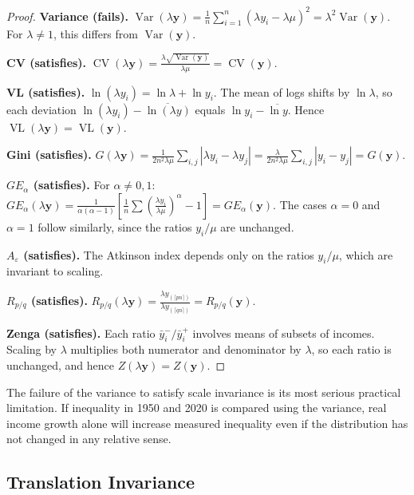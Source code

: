 \documentclass[12pt]{article}
\theoremstyle{plain}
\theoremstyle{definition}
\theoremstyle{remark}
\newcommand{\bfy}{\mathbf{y}}
\begin{document}
\begin{proof}
\textbf{Variance (fails).}
$\operatorname{Var}(\lambda\bfy) = \frac{1}{n}\sum_{i=1}^n (\lambda y_i - \lambda\mu)^2 = \lambda^2 \operatorname{Var}(\bfy)$.
For $\lambda \neq 1$, this differs from $\operatorname{Var}(\bfy)$.

\textbf{CV (satisfies).}
$\operatorname{CV}(\lambda\bfy) = \frac{\lambda\sqrt{\operatorname{Var}(\bfy)}}{\lambda\mu} = \operatorname{CV}(\bfy)$.

\textbf{VL (satisfies).}
$\ln(\lambda y_i) = \ln\lambda + \ln y_i$.
The mean of logs shifts by $\ln\lambda$, so each deviation $\ln(\lambda y_i) - \overline{\ln(\lambda y)}$ equals $\ln y_i - \overline{\ln y}$.
Hence $\operatorname{VL}(\lambda\bfy) = \operatorname{VL}(\bfy)$.

\textbf{Gini (satisfies).}
$G(\lambda\bfy) = \frac{1}{2n^2 \lambda\mu}\sum_{i,j}|\lambda y_i - \lambda y_j| = \frac{\lambda}{2n^2\lambda\mu}\sum_{i,j}|y_i - y_j| = G(\bfy)$.

\textbf{$GE_\alpha$ (satisfies).}
For $\alpha \neq 0, 1$: $GE_\alpha(\lambda\bfy) = \frac{1}{\alpha(\alpha-1)}\left[\frac{1}{n}\sum\left(\frac{\lambda y_i}{\lambda\mu}\right)^\alpha - 1\right] = GE_\alpha(\bfy)$.
The cases $\alpha = 0$ and $\alpha = 1$ follow similarly, since the ratios $y_i/\mu$ are unchanged.

\textbf{$A_\varepsilon$ (satisfies).}
The Atkinson index depends only on the ratios $y_i/\mu$, which are invariant to scaling.

\textbf{$R_{p/q}$ (satisfies).}
$R_{p/q}(\lambda\bfy) = \frac{\lambda y_{(\lceil pn \rceil)}}{\lambda y_{(\lceil qn \rceil)}} = R_{p/q}(\bfy)$.

\textbf{Zenga (satisfies).}
Each ratio $\bar{y}^{-}_i / \bar{y}^{+}_i$ involves means of subsets of incomes.
Scaling by $\lambda$ multiplies both numerator and denominator by $\lambda$, so each ratio is unchanged, and hence $Z(\lambda\bfy) = Z(\bfy)$.\qedhere
\end{proof}

The failure of the variance to satisfy scale invariance is its most serious practical limitation.
If inequality in 1950 and 2020 is compared using the variance, real income growth alone will increase measured inequality even if the distribution has not changed in any relative sense.

\subsection{Translation Invariance}
\end{document}
